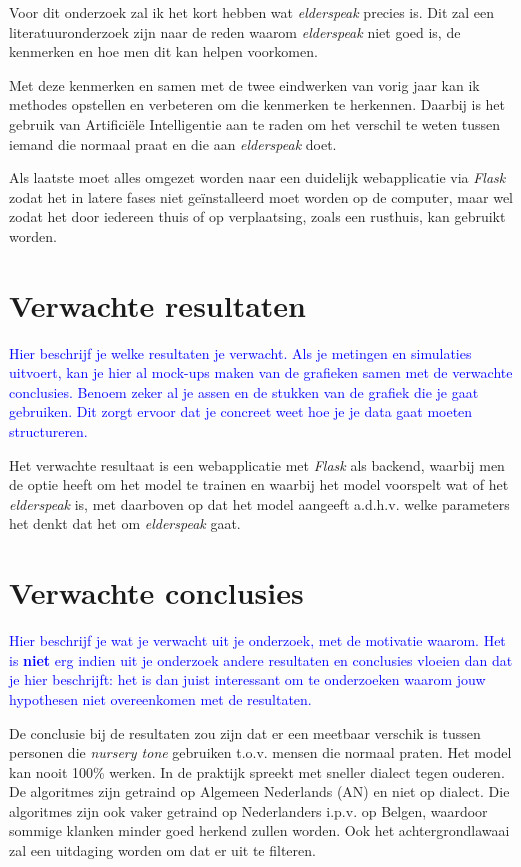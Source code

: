 Voor dit onderzoek zal ik het kort hebben wat \textit{elderspeak} precies is. Dit zal een literatuuronderzoek zijn naar de reden waarom \textit{elderspeak} niet goed is, de kenmerken en hoe men dit kan helpen voorkomen.

Met deze kenmerken en samen met de twee eindwerken van vorig jaar kan ik methodes opstellen en verbeteren om die kenmerken te herkennen. Daarbij is het gebruik van Artificiële Intelligentie aan te raden om het verschil te weten tussen iemand die normaal praat en die aan \textit{elderspeak} doet.

Als laatste moet alles omgezet worden naar een duidelijk webapplicatie via \textit{Flask} zodat het in latere fases niet geïnstalleerd moet worden op de computer, maar wel zodat het door iedereen thuis of op verplaatsing, zoals een rusthuis, kan gebruikt worden.


\section{Verwachte resultaten}
\label{sec:verwachte_resultaten}

\textcolor{blue}{Hier beschrijf je welke resultaten je verwacht. Als je metingen en simulaties uitvoert, kan je hier al mock-ups maken van de grafieken samen met de verwachte conclusies. Benoem zeker al je assen en de stukken van de grafiek die je gaat gebruiken. Dit zorgt ervoor dat je concreet weet hoe je je data gaat moeten structureren.}

Het verwachte resultaat is een webapplicatie met \textit{Flask} als backend, waarbij men de optie heeft om het model te trainen en waarbij het model voorspelt wat of het \textit{elderspeak} is, met daarboven op dat het model aangeeft a.d.h.v. welke parameters het denkt dat het om \textit{elderspeak} gaat.


\section{Verwachte conclusies}
\label{sec:verwachte_conclusies}

\textcolor{blue}{Hier beschrijf je wat je verwacht uit je onderzoek, met de motivatie waarom. Het is \textbf{niet} erg indien uit je onderzoek andere resultaten en conclusies vloeien dan dat je hier beschrijft: het is dan juist interessant om te onderzoeken waarom jouw hypothesen niet overeenkomen met de resultaten.}

De conclusie bij de resultaten zou zijn dat er een meetbaar verschik is tussen personen die \textit{nursery tone} gebruiken t.o.v. mensen die normaal praten. Het model kan nooit 100\% werken. In de praktijk spreekt met sneller dialect tegen ouderen. De algoritmes zijn getraind op Algemeen Nederlands (AN) en niet op dialect. Die algoritmes zijn ook vaker getraind op Nederlanders i.p.v. op Belgen, waardoor sommige klanken minder goed herkend zullen worden. Ook het achtergrondlawaai zal een uitdaging worden om dat er uit te filteren.

